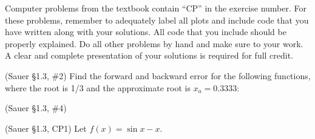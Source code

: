 \documentclass[12pt,fleqn]{exam}
\begin{document}
Computer problems from the textbook contain ``CP'' in the exercise number. For these problems, remember to adequately label all plots and include code that you have written along with your solutions. All code that you include should be properly explained. Do all other problems by hand and make sure to your work. A clear and complete presentation of your solutions is required for full credit.

\begin{questions}

\question (Sauer \S1.3, \#2) Find the forward and backward error for the following functions, where the root is 1/3 and the approximate root is $x_a = 0.3333$:


\question (Sauer \S1.3, \#4)


\question (Sauer \S1.3, CP1) Let $f(x) = \sin x - x$.

\end{questions}
\end{document}

